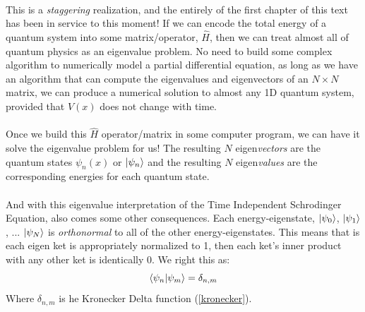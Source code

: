 \documentclass[12pt,letterpaper]{book}
\begin{document}
\paragraph*{}This is a \textit{staggering} realization, and the entirely of the first chapter of this text has been in service to this moment! If we can encode the total energy of a quantum system into some matrix/operator, $\hat{H}$, then we can treat almost all of quantum physics as an eigenvalue problem. No need to build some complex algorithm to numerically model a partial differential equation, as long as we have an algorithm that can compute the eigenvalues and eigenvectors of an $N \times N$ matrix, we can produce a numerical solution to almost any 1D quantum system, provided that $V(x)$ does not change with time.
\paragraph*{}Once we build this $\hat{H}$ operator/matrix in some computer program, we can have it solve the eigenvalue problem for us! The resulting $N$ eigen\textit{vectors} are the quantum states $\psi_n(x)$ or $\ket{\psi_n}$ and the resulting $N$ eigen\textit{values} are the corresponding energies for each quantum state.
\paragraph*{}And with this eigenvalue interpretation of the Time Independent Schrodinger Equation, also comes some other consequences. Each energy-eigenstate, $\ket{\psi_0}$, $\ket{\psi_1}$, ...  $\ket{\psi_N}$ is \textit{orthonormal} to all of the other energy-eigenstates. This means that is each eigen ket is appropriately normalized to 1, then each ket's inner product with any other ket is identically 0. We right this as:
\begin{equation}
\label{orthonorm}
\braket{\psi_n}{\psi_m} = \delta_{n,m}
\end{equation}
Where $\delta_{n,m}$ is he Kronecker Delta function (\ref{kronecker}).
\end{document}
